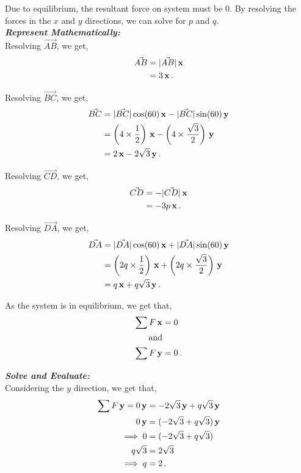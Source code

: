 \begin{subquestions}
Due to equilibrium, the resultant force on system must be 0. By resolving the forces in the $x$ and $y$ directions, we can solve for $p$ and $q$.\\




\textbf{\textit{Represent Mathematically:}} \\
Resolving $\vec{AB}$, we get,
\begin{align}
	\vec{AB} & = |\vec{AB}|\,\mathbf{x} \nonumber \\
	         & = 3\,\mathbf{x} \,.
\end{align}

Resolving $\vec{BC}$, we get,
\begin{align}
	\vec{BC} & = |\vec{BC}|\cos(60)\,\mathbf{x} - |\vec{BC}|\sin(60)\,\mathbf{y} \nonumber \\
	         & = \left(4\times \frac{1}{2}\right)\,\mathbf{x} - \left(4\times \frac{\sqrt{3}}{2}\right)\,\mathbf{y} \nonumber \\
	         & = 2 \,\mathbf{x} - 2\sqrt{3}\,\mathbf{y} \,.
\end{align}

Resolving $\vec{CD}$, we get,
\begin{align}
	\vec{CD} & = -|\vec{CD}|\,\mathbf{x} \nonumber \\
			 & = -3p\,\mathbf{x} \,.
\end{align}

Resolving $\vec{DA}$, we get,
\begin{align}
	\vec{DA} & = |\vec{DA}|\cos(60)\,\mathbf{x} + |\vec{DA}|\sin(60)\,\mathbf{y} \nonumber \\
	         & = \left(2q\times \frac{1}{2}\right)\,\mathbf{x} + \left(2q\times\frac{\sqrt{3}}{2}\right)\,\mathbf{y} \nonumber \\
	         & = q\,\mathbf{x} + q\sqrt{3}\,\mathbf{y} \,.
\end{align}

As the system is in equilibrium, we get that,
\begin{align}
	\sum F \,\mathbf{x} & = 0 \nonumber \\
	\text{and} \nonumber \\
	\sum F \,\mathbf{y} & = 0 \,.
\end{align}




\textbf{\textit{Solve and Evaluate:}} \\
Considering the $y$ direction, we get that,
\begin{align}
	\sum F\,\mathbf{y} = 0\,\mathbf{y} & = -2\sqrt{3}\,\mathbf{y} + q\sqrt{3}\,\mathbf{y} \nonumber \\
	                   0\,\mathbf{y} & = (-2\sqrt{3} +q\sqrt{3})\,\mathbf{y} \nonumber \\
	        \implies   0 & =  (-2\sqrt{3} +q\sqrt{3}) \nonumber \\
					q\sqrt{3} & = 2\sqrt{3} \nonumber \\
				   \implies q & = 2 \,.
\end{align}


\end{subquestions}
